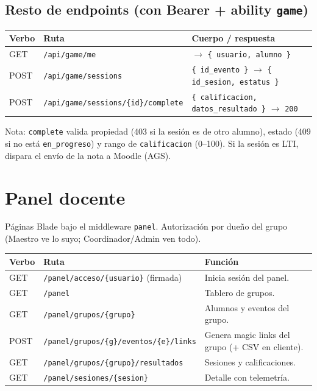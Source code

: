 \documentclass[11pt,letterpaper]{article}
\begin{document}
\subsection{Resto de endpoints (con Bearer + ability \texttt{game})}
\begin{longtable}{p{1.1cm} p{6cm} p{7cm}}
\toprule \textbf{Verbo} & \textbf{Ruta} & \textbf{Cuerpo / respuesta} \\ \midrule
\endhead
GET & \texttt{/api/game/me} & $\rightarrow$ \texttt{\{ usuario, alumno \}} \\
POST & \texttt{/api/game/sessions} & \texttt{\{ id\_evento \}} $\rightarrow$ \texttt{\{ id\_sesion, estatus \}} \\
POST & \texttt{/api/game/sessions/\{id\}/complete} & \texttt{\{ calificacion, datos\_resultado \}} $\rightarrow$ \texttt{200} \\
\bottomrule
\end{longtable}

Nota: \texttt{complete} valida propiedad (403 si la sesión es de otro alumno),
estado (409 si no está \texttt{en\_progreso}) y rango de \texttt{calificacion}
(0--100). Si la sesión es LTI, dispara el envío de la nota a Moodle (AGS).

\section{Panel docente}
Páginas Blade bajo el middleware \texttt{panel}. Autorización por dueño del grupo
(Maestro ve lo suyo; Coordinador/Admin ven todo).

\begin{longtable}{p{1.1cm} p{6.6cm} p{6.4cm}}
\toprule \textbf{Verbo} & \textbf{Ruta} & \textbf{Función} \\ \midrule
\endhead
GET & \texttt{/panel/acceso/\{usuario\}} (firmada) & Inicia sesión del panel. \\
GET & \texttt{/panel} & Tablero de grupos. \\
GET & \texttt{/panel/grupos/\{grupo\}} & Alumnos y eventos del grupo. \\
POST & \texttt{/panel/grupos/\{g\}/eventos/\{e\}/links} & Genera magic links del grupo (+ CSV en cliente). \\
GET & \texttt{/panel/grupos/\{grupo\}/resultados} & Sesiones y calificaciones. \\
GET & \texttt{/panel/sesiones/\{sesion\}} & Detalle con telemetría. \\
\bottomrule
\end{longtable}
\end{document}
